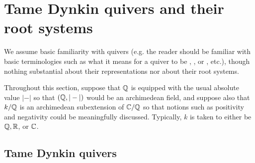 \section{Tame Dynkin quivers and their root systems} \label{section: tame_dynkin_quivers}
    \begin{convention}
        We assume basic familiarity with quivers (e.g. the reader should be familiar with basic terminologies such as what it means for a quiver to be , , or , etc.), though nothing substantial about their representations nor about their root systems. 
    \end{convention}
    \begin{convention}
        Throughout this section, suppose that $\mathbb{Q}$ is equipped with the usual absolute value $|-|$ so that $(\mathbb{Q}, |-|)$ would be an archimedean field, and suppose also that $k/\mathbb{Q}$ is an archimedean subextension of $\mathbb{C}/\mathbb{Q}$ so that notions such as positivity and negativity could be meaningfully discussed. Typically, $k$ is taken to either be $\mathbb{Q}, \mathbb{R}$, or $\mathbb{C}$.
    \end{convention}
    
    \subsection{Tame Dynkin quivers}
